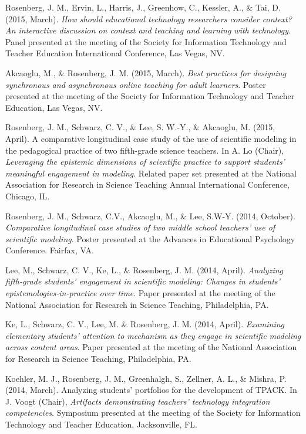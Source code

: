 \documentclass[14,]{article}
\begin{document}
Rosenberg, J. M., Ervin, L., Harris, J., Greenhow, C., Kessler, A., \&
Tai, D. (2015, March). \emph{How should educational technology
researchers consider context? An interactive discussion on context and
teaching and learning with technology}. Panel presented at the meeting
of the Society for Information Technology and Teacher Education
International Conference, Las Vegas, NV.

Akcaoglu, M., \& Rosenberg, J. M. (2015, March). \emph{Best practices
for designing synchronous and asynchronous online teaching for adult
learners}. Poster presented at the meeting of the Society for
Information Technology and Teacher Education, Las Vegas, NV.

Rosenberg, J. M., Schwarz, C. V., \& Lee, S. W.-Y., \& Akcaoglu, M.
(2015, April). A comparative longitudinal case study of the use of
scientific modeling in the pedagogical practice of two fifth-grade
science teachers. In A. Lo (Chair), \emph{Leveraging the epistemic
dimensions of scientific practice to support students' meaningful
engagement in modeling}. Related paper set presented at the National
Association for Research in Science Teaching Annual International
Conference, Chicago, IL.

Rosenberg, J. M., Schwarz, C.V., Akcaoglu, M., \& Lee, S.W-Y. (2014,
October). \emph{Comparative longitudinal case studies of two middle
school teachers' use of scientific modeling}. Poster presented at the
Advances in Educational Psychology Conference. Fairfax, VA.

Lee, M., Schwarz, C. V., Ke, L., \& Rosenberg, J. M. (2014, April).
\emph{Analyzing fifth-grade students' engagement in scientific modeling:
Changes in students' epistemologies-in-practice over time}. Paper
presented at the meeting of the National Association for Research in
Science Teaching, Philadelphia, PA.

Ke, L., Schwarz, C. V., Lee, M. \& Rosenberg, J. M. (2014, April).
\emph{Examining elementary students' attention to mechanism as they
engage in scientific modeling across content areas}. Paper presented at
the meeting of the National Association for Research in Science
Teaching, Philadelphia, PA.

Koehler, M. J., Rosenberg, J. M., Greenhalgh, S., Zellner, A. L., \&
Mishra, P. (2014, March). Analyzing students' portfolios for the
development of TPACK. In J. Voogt (Chair), \emph{Artifacts demonstrating
teachers' technology integration competencies}. Symposium presented at
the meeting of the Society for Information Technology and Teacher
Education, Jacksonville, FL.
\end{document}
